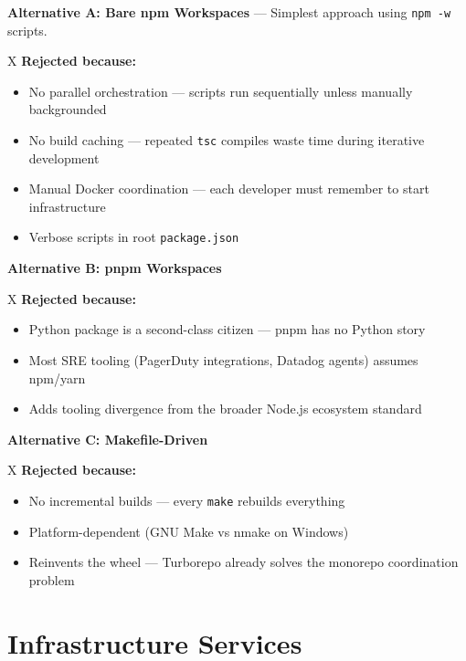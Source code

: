 \documentclass[11pt,a4paper]{article}
\begin{document}
\begin{alternativebox}
\textbf{Alternative A: Bare npm Workspaces} — Simplest approach using \texttt{npm -w} scripts.

X \textbf{Rejected because:}
\begin{itemize}[leftmargin=*,itemsep=2pt]
  \item No parallel orchestration — scripts run sequentially unless manually backgrounded
  \item No build caching — repeated \texttt{tsc} compiles waste time during iterative development
  \item Manual Docker coordination — each developer must remember to start infrastructure
  \item Verbose scripts in root \texttt{package.json}
\end{itemize}

\vspace{6pt}
\textbf{Alternative B: pnpm Workspaces}

X \textbf{Rejected because:}
\begin{itemize}[leftmargin=*,itemsep=2pt]
  \item Python package is a second-class citizen — pnpm has no Python story
  \item Most SRE tooling (PagerDuty integrations, Datadog agents) assumes npm/yarn
  \item Adds tooling divergence from the broader Node.js ecosystem standard
\end{itemize}

\vspace{6pt}
\textbf{Alternative C: Makefile-Driven}

X \textbf{Rejected because:}
\begin{itemize}[leftmargin=*,itemsep=2pt]
  \item No incremental builds — every \texttt{make} rebuilds everything
  \item Platform-dependent (GNU Make vs nmake on Windows)
  \item Reinvents the wheel — Turborepo already solves the monorepo coordination problem
\end{itemize}
\end{alternativebox}

\section{Infrastructure Services}
\end{document}
